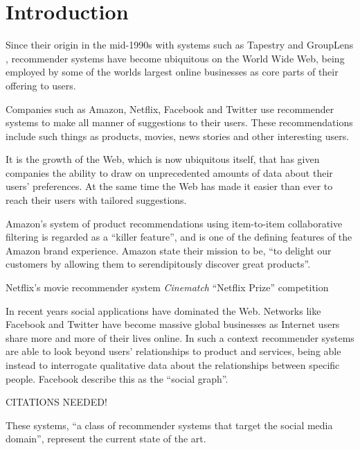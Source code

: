 \iffalse 
Chapter 1: Introduction - the topic, the background, why the topic is relevant or of interest to you, what you hoped to achieve, the aims and objectives of the project.  
\fi

\section{Introduction}


Since their origin in the mid-1990s with systems such as Tapestry \cite{Goldberg92} and GroupLens \cite{Resnick94}, recommender systems have become ubiquitous on the World Wide Web, being employed by some of the worlds largest online businesses as core parts of their offering to users.

Companies such as Amazon, Netflix, Facebook and Twitter use recommender systems to make all manner of suggestions to their users. These recommendations include such things as products, movies, news stories and other interesting users. 

It is the growth of the Web, which is now ubiquitous itself, that has given companies the ability to draw on unprecedented amounts of data about their users' preferences. At the same time the Web has made it easier than ever to reach their users with tailored suggestions.

Amazon's system of product recommendations using item-to-item collaborative filtering is regarded as a ``killer feature''\cite{Fortune12}, and is one of the defining features of the Amazon brand experience. Amazon state their mission to be, ``to delight our customers by allowing them to serendipitously discover great products''\cite{Fortune12}.

Netflix's movie recommender system \emph{Cinematch}  ``Netflix Prize'' competition 



In recent years social applications have dominated the Web. Networks like Facebook and Twitter have become massive global businesses as Internet users share more and more of their lives online. In such a context recommender systems are able to look beyond users' relationships to product and services, being able instead to interrogate qualitative data about the relationships between specific people. Facebook describe this as the ``social graph''.

CITATIONS NEEDED!

These systems, ``a class of recommender systems that target the social media domain''\cite{Guy11}, represent the current state of the art. 

